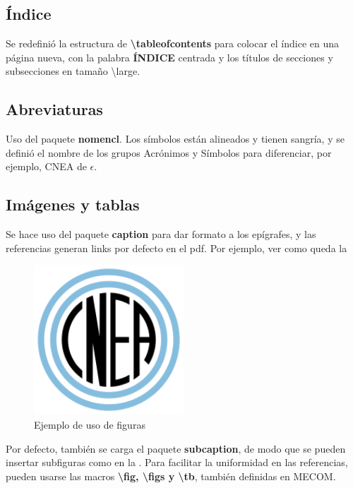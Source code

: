 \documentclass[a4paper,11pt,twoside]{MECOM}
\begin{document}
        
    \subsection{\'Indice}
        Se redefini\'o la estructura de {\bf \textbackslash tableofcontents} para colocar el \'indice en una p\'agina nueva, con la palabra {\bf \'INDICE} centrada y los t\'itulos de secciones y subsecciones en tama\~no \textbackslash large.
        


        
    \subsection{Abreviaturas}
        Uso del paquete {\bf nomencl}. Los s\'imbolos est\'an alineados y tienen sangr\'ia, y se defini\'o el nombre de los grupos Acr\'onimos y S\'imbolos para diferenciar, por ejemplo, CNEA de $\epsilon$.


        
    \subsection{Im\'agenes y tablas}
    Se hace uso del paquete {\bf caption} para dar formato a los ep\'igrafes, y las referencias generan links por defecto en el pdf. Por ejemplo, ver como queda la 
    \begin{figure}[ht]
        \centering
        \includegraphics[width=0.5\textwidth]{Logo_CNEA}
        \caption{Ejemplo de uso de figuras}
        \label{fg:Logo_CNEA}
    \end{figure}
    
    \par
    Por defecto, tambi\'en se carga el paquete {\bf subcaption}, de modo que se pueden insertar subfiguras como en la . Para facilitar la uniformidad en las referencias, pueden usarse las macros {\bf \textbackslash fig, \textbackslash figs y \textbackslash tb}, tambi\'en definidas en MECOM.
    
\end{document}

